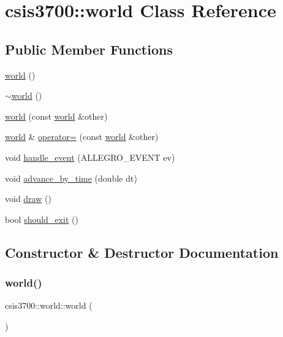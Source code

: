 \hypertarget{classcsis3700_1_1world}{}\section{csis3700\+:\+:world Class Reference}
\label{classcsis3700_1_1world}
\subsection*{Public Member Functions}
\begin{DoxyCompactItemize}
\item 
\hyperlink{classcsis3700_1_1world_add94e82a5e7c88d9f4f2714c199693b1}{world} ()
\item 
\hyperlink{classcsis3700_1_1world_ae793effd77990768c2f7565cb2daba70}{$\sim$world} ()
\item 
\hyperlink{classcsis3700_1_1world_a323fcd5b15ee4a274bffe02cf9c7cd0e}{world} (const \hyperlink{classcsis3700_1_1world}{world} \&other)
\item 
\hyperlink{classcsis3700_1_1world}{world} \& \hyperlink{classcsis3700_1_1world_a1ce9a5a4c2a161b8d0bd079727632d62}{operator=} (const \hyperlink{classcsis3700_1_1world}{world} \&other)
\item 
void \hyperlink{classcsis3700_1_1world_a244cfed1968f6ed5133b82eebcb0c158}{handle\+\_\+event} (A\+L\+L\+E\+G\+R\+O\+\_\+\+E\+V\+E\+NT ev)
\item 
void \hyperlink{classcsis3700_1_1world_a2b4a33cc658001cde9d838ff50237a5f}{advance\+\_\+by\+\_\+time} (double dt)
\item 
void \hyperlink{classcsis3700_1_1world_acd1681a6ac117cf74ac4590938d60a80}{draw} ()
\item 
bool \hyperlink{classcsis3700_1_1world_a72b6c90fa52ae434dc866f40caf5ee07}{should\+\_\+exit} ()
\end{DoxyCompactItemize}


\subsection{Constructor \& Destructor Documentation}
\mbox{\label{classcsis3700_1_1world_add94e82a5e7c88d9f4f2714c199693b1}} 
\subsubsection{\texorpdfstring{world()}{world()}\hspace{0.1cm}{\footnotesize\ttfamily [1/2]}}
{\footnotesize\ttfamily csis3700\+::world\+::world (\begin{DoxyParamCaption}{ }\end{DoxyParamCaption})}

